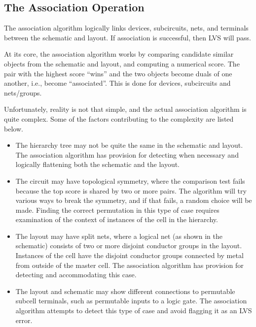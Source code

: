 \subsection{The Association Operation}

The association algorithm logically links devices, subcircuits, nets,
and terminals between the schematic and layout.  If association is
successful, then LVS will pass.

At its core, the association algorithm works by comparing candidate
similar objects from the schematic and layout, and computing a
numerical score.  The pair with the highest score ``wins'' and the two
objects become duals of one another, i.e., become ``associated''. 
This is done for devices, subcircuits and nets/groups.

Unfortunately, reality is not that simple, and the actual association
algorithm is quite complex.  Some of the factors contributing to the
complexity are listed below.

\begin{itemize}
\item{The hierarchy tree may not be quite the same in the schematic
and layout.  The association algorithm has provision for detecting
when necessary and logically flattening both the schematic and the
layout.}

\item{The circuit may have topological symmetry, where the comparison
test fails because the top score is shared by two or more pairs.  The
algorithm will try various ways to break the symmetry, and if that
fails, a random choice will be made.  Finding the correct permutation
in this type of case requires examination of the context of instances
of the cell in the hierarchy.}

\item{The layout may have split nets, where a logical net (as shown in
the schematic) consists of two or more disjoint conductor groups in
the layout.  Instances of the cell have the disjoint conductor groups
connected by metal from outside of the master cell.  The association
algorithm has provision for detecting and accommodating this case.}

\item{The layout and schematic may show different connections to
permutable subcell terminals, such as permutable inputs to a logic
gate.  The association algorithm attempts to detect this type of case
and avoid flagging it as an LVS error.}
\end{itemize}

